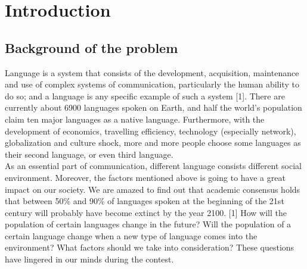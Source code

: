 \documentclass{mcmthesis}
\begin{document}
\section{Introduction}
\subsection{Background of the problem}
\hspace*{8mm}Language is a system that consists of the development, acquisition, maintenance and use of complex systems of communication, particularly the human ability to do so; and a language is any specific example of such a system [1]. There are currently about 6900 languages spoken on Earth, and half the world's population claim ten major languages as a native language. Furthermore, with the development of economics, travelling efficiency, technology (especially network), globalization and culture shock, more and more people choose some languages as their second language, or even third language. \\
\hspace*{8mm} As an essential part of communication, different language consists different social environment. Moreover, the factors mentioned above is going to have a great impact on our society. We are amazed to find out that academic consensus holds that between 50\% and 90\% of languages spoken at the beginning of the 21st century will probably have become extinct by the year 2100. [1] How will the population of certain languages change in the future? Will the population of a certain language change when a new type of language comes into the environment? What factors should we take into consideration? These questions have lingered in our minds during the contest.
\end{document}
